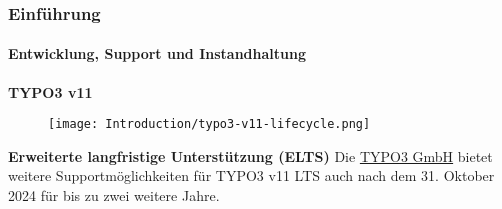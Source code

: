 %

\begin{frame}[fragile]
	\frametitle{Einführung}
	\framesubtitle{Entwicklung, Support und Instandhaltung}

	\textbf{TYPO3 v11}

	\begin{figure}
		\texttt{[image: Introduction/typo3-v11-lifecycle.png]}
	\end{figure}

	\textbf{Erweiterte langfristige Unterstützung (ELTS)}\newline
	\smaller
		Die \href{https://typo3.com}{TYPO3 GmbH} bietet weitere Supportmöglichkeiten
		für TYPO3 v11 LTS auch nach dem 31. Oktober 2024 für bis zu zwei weitere Jahre.
	\normalsize

\end{frame}

